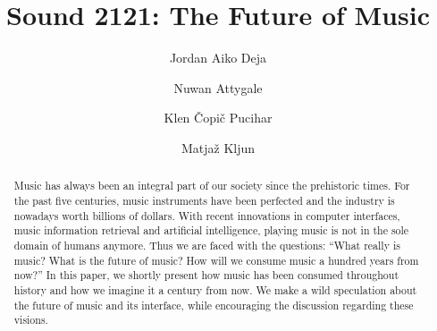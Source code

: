 \documentclass[sigchi]{acmart}
\begin{document}
\title{Sound 2121: The Future of Music}


\author{Jordan Aiko Deja}

\author{Nuwan Attygale}

\author{Klen Čopič Pucihar}

\author{Matjaž Kljun}


\begin{abstract}
 Music has always been an integral part of our society since the prehistoric times. For the past five centuries, music instruments have been perfected and the industry is nowadays worth billions of dollars. With recent innovations in computer interfaces, music information retrieval and artificial intelligence, playing music is not in the sole domain of humans anymore. Thus we are faced with the questions: ``What really is music? What is the future of music? How will we consume music a hundred years from now?'' In this paper, we shortly present how music has been consumed throughout history and how we imagine it a century from now. We make a wild speculation about the future of music and its interface, while encouraging the discussion regarding these visions. 
\end{abstract}
\end{document}
